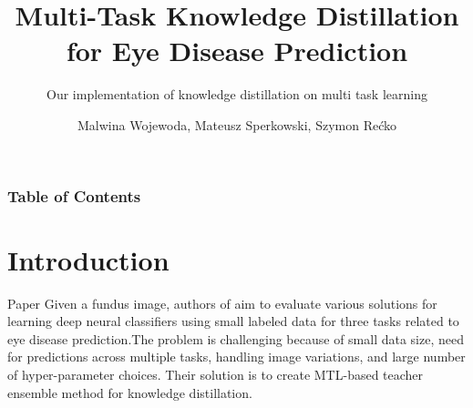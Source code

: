 \documentclass [xcolor=svgnames, t] {beamer}
\title[RUNNING TITLE]{Multi-Task Knowledge Distillation for Eye Disease Prediction}
\subtitle{Our implementation of knowledge distillation on multi task learning}
\institute[]{Warsaw University of Technology}
\author[Warsztaty Badawcze KM1]{
	Malwina Wojewoda,
	Mateusz Sperkowski,
	Szymon Rećko }
\institute[]{Warsaw University of Technology}
\date{\AdvanceDate[1]{\today}}
\begin{document}
\begin{frame}
\maketitle
\end{frame}







\begin{frame}
\frametitle{Table of Contents}
\tableofcontents
\end{frame}


	
	




\section{Introduction}
\begin{frame}{Paper}
Given a fundus image, authors of \cite{Chelaramani_2021_WACV} aim to evaluate various solutions for
learning deep neural classifiers using small labeled data for
three tasks related to eye disease prediction.The problem is challenging because of small data size,
need for predictions across multiple tasks, handling image variations, and large number of hyper-parameter choices. Their solution is to create MTL-based teacher ensemble method for knowledge distillation.

\end{frame}
\end{document}
